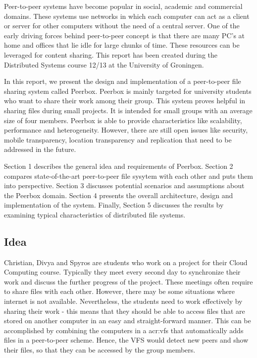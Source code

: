 Peer-to-peer systems have become  popular  in social, academic and commercial domains. These systems use networks in which each computer can act as a client or server for other computers without the need of a central server. One of the early driving forces behind peer-to-peer concept is that there are many PC's at home and offices that lie idle for large chunks of time. These resources can be leveraged for content sharing. This report has been created during the Distributed Systems course 12/13 at the University of Groningen.

In this report, we present the design and implementation of a peer-to-peer file sharing system called Peerbox. Peerbox is mainly targeted for university students who want to share their work among their group. This system proves helpful in sharing files during small projects. It is intended for small groups with an average size of four members. Peerbox is able to provide characteristics like scalability, performance and heterogeneity. However, there are still open issues like security, mobile transparency, location transparency and replication that need to be addressed in the future. 

Section 1 describes the general idea and requirements  of Peerbox. Section 2 compares state-of-the-art peer-to-peer file sysytem with each other and puts them into perspective. Section 3 discusses potential scenarios and assumptions about the Peerbox domain.  Section 4 presents the overall architecture, design and implementation of the system. Finally, Section 5  discusses the results by examining typical characteristics of distributed file systems. 

\subsection{Idea}

Christian, Divya and Spyros are students who work on a project for their Cloud Computing course. Typically they meet every second day to synchronize their work and discuss the further progress of the project. These meetings often require to share files with each other. However, there may be some situations where internet is not available. Nevertheless, the students need to work effectively by sharing their work - this means that they should be able to access files that are stored on another computer in an easy and straight-forward manner. This can be accomplished by combining the computers in a \gls{acr:vfs} that automatically adds files in a peer-to-peer scheme. Hence, the VFS would  detect new peers and show their files, so that they can be accessed by the group members.

